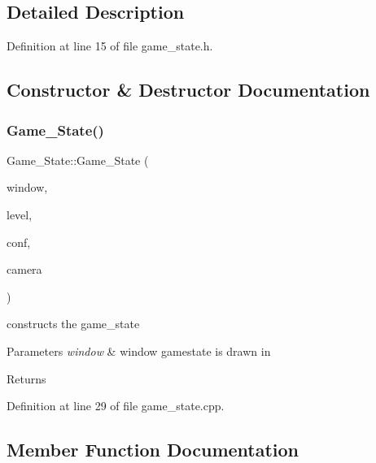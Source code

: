 \subsection{Detailed Description}


Definition at line 15 of file game\+\_\+state.\+h.



\subsection{Constructor \& Destructor Documentation}
\hypertarget{class_game___state_a93409470dc62892876fe0dafafb910ad}{}\label{class_game___state_a93409470dc62892876fe0dafafb910ad} 
\subsubsection{\texorpdfstring{Game\+\_\+\+State()}{Game\_State()}}
{\footnotesize\ttfamily Game\+\_\+\+State\+::\+Game\+\_\+\+State (\begin{DoxyParamCaption}\item[{sf\+::\+Render\+Window \&}]{window,  }\item[{int}]{level,  }\item[{\hyperlink{class_config}{Config} \&}]{conf,  }\item[{sf\+::\+View \&}]{camera }\end{DoxyParamCaption})}

constructs the game\+\_\+state 
\begin{DoxyParams}{Parameters}
{\em window} & window gamestate is drawn in \\
\hline
\end{DoxyParams}
\begin{DoxyReturn}{Returns}

\end{DoxyReturn}


Definition at line 29 of file game\+\_\+state.\+cpp.



\subsection{Member Function Documentation}
\hypertarget{class_game___state_a8dad75e154735be07e6d8d257bda049f}{}\label{class_game___state_a8dad75e154735be07e6d8d257bda049f} 
